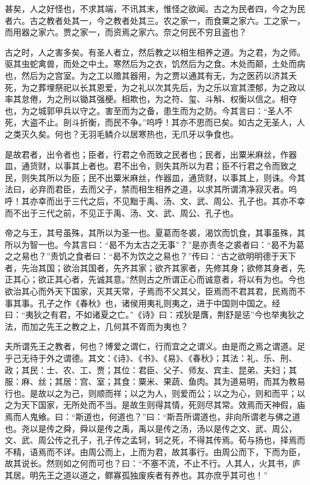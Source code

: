 \documentclass[UTF8,titlepage,oneside]{ctexbook}
\begin{document}
甚矣，人之好怪也，不求其端，不讯其末，惟怪之欲闻。古之为民者四，今之为民者六。古之教者处其一，今之教者处其三。农之家一，而食粟之家六。工之家一，而用器之家六。贾之家一，而资焉之家六。奈之何民不穷且盗也？

古之时，人之害多矣。有圣人者立，然后教之以相生相养之道。为之君，为之师。驱其虫蛇禽兽，而处之中土。寒然后为之衣，饥然后为之食。木处而颠，土处而病也，然后为之宫室。为之工以赡其器用，为之贾以通其有无，为之医药以济其夭死，为之葬埋祭祀以长其恩爱，为之礼以次其先后，为之乐以宣其湮郁，为之政以率其怠倦，为之刑以锄其强梗。相欺也，为之符、玺、斗斛、权衡以信之。相夺也，为之城郭甲兵以守之。害至而为之备，患生而为之防。今其言曰：“圣人不死，大盗不止。剖斗折衡，而民不争。”呜呼！其亦不思而已矣。如古之无圣人，人之类灭久矣。何也？无羽毛鳞介以居寒热也，无爪牙以争食也。

是故君者，出令者也；臣者，行君之令而致之民者也；民者，出粟米麻丝，作器皿，通货财，以事其上者也。君不出令，则失其所以为君；臣不行君之令而致之民，则失其所以为臣；民不出粟米麻丝，作器皿，通货财，以事其上，则诛。今其法曰，必弃而君臣，去而父子，禁而相生相养之道，以求其所谓清净寂灭者。呜呼！其亦幸而出于三代之后，不见黜于禹、汤、文、武、周公、孔子也。其亦不幸而不出于三代之前，不见正于禹、汤、文、武、周公、孔子也。

帝之与王，其号虽殊，其所以为圣一也。夏葛而冬裘，渴饮而饥食，其事虽殊，其所以为智一也。今其言曰：“曷不为太古之无事”？”是亦责冬之裘者曰：“曷不为葛之之易也？”责饥之食者曰：“曷不为饮之之易也？”传曰：“古之欲明明德于天下者，先治其国；欲治其国者，先齐其家；欲齐其家者，先修其身；欲修其身者，先正其心；欲正其心者，先诚其意。”然则古之所谓正心而诚意者，将以有为也。今也欲治其心而外天下国家，灭其天常，子焉而不父其父，臣焉而不君其君，民焉而不事其事。孔子之作《春秋》也，诸侯用夷礼则夷之，进于中国则中国之。经曰：“夷狄之有君，不如诸夏之亡。”《诗》曰：戎狄是膺，荆舒是惩”今也举夷狄之法，而加之先王之教之上，几何其不胥而为夷也？

夫所谓先王之教者，何也？博爱之谓仁，行而宜之之谓义。由是而之焉之谓道。足乎己无待于外之谓德。其文：《诗》、《书》、《易》、《春秋》；其法：礼、乐、刑、政；其民：士、农、工、贾；其位：君臣、父子、师友、宾主、昆弟、夫妇；其服：麻、丝；其居：宫、室；其食：粟米、果蔬、鱼肉。其为道易明，而其为教易行也。是故以之为己，则顺而祥；以之为人，则爱而公；以之为心，则和而平；以之为天下国家，无所处而不当。是故生则得其情，死则尽其常。效焉而天神假，庙焉而人鬼飨。曰：“斯道也，何道也？”曰：“斯吾所谓道也，非向所谓老与佛之道也。尧以是传之舜，舜以是传之禹，禹以是传之汤，汤以是传之文、武、周公，文、武、周公传之孔子，孔子传之孟轲，轲之死，不得其传焉。荀与扬也，择焉而不精，语焉而不详。由周公而上，上而为君，故其事行。由周公而下，下而为臣，故其说长。然则如之何而可也？曰：“不塞不流，不止不行。人其人，火其书，庐其居。明先王之道以道之，鳏寡孤独废疾者有养也。其亦庶乎其可也！”
\end{document}
